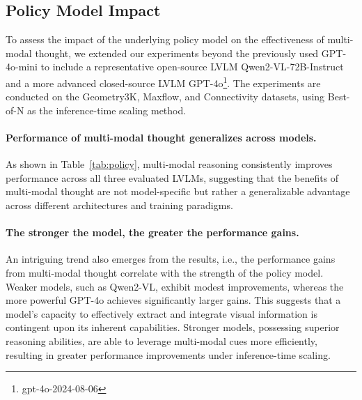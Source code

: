 \subsection{Policy Model Impact}




To assess the impact of the underlying policy model on the effectiveness of multi-modal thought, we extended our experiments beyond the previously used GPT-4o-mini to include a representative open-source LVLM Qwen2-VL-72B-Instruct and a more advanced closed-source LVLM GPT-4o\footnote{gpt-4o-2024-08-06}. The experiments are conducted on the Geometry3K, Maxflow, and Connectivity datasets, using Best-of-N as the inference-time scaling method.

\paragraph{Performance of multi-modal thought generalizes across models.}
As shown in Table~\ref{tab:policy}, multi-modal reasoning consistently improves performance across all three evaluated LVLMs, suggesting that the benefits of multi-modal thought are not model-specific but rather a generalizable advantage across different architectures and training paradigms.



\paragraph{The stronger the model, the greater the performance gains.}
An intriguing trend also emerges from the results, i.e., the performance gains from multi-modal thought correlate with the strength of the policy model. Weaker models, such as Qwen2-VL, exhibit modest improvements, whereas the more powerful GPT-4o achieves significantly larger gains. This suggests that a model's capacity to effectively extract and integrate visual information is contingent upon its inherent capabilities.  Stronger models, possessing superior reasoning abilities, are able to leverage multi-modal cues more efficiently, resulting in greater performance improvements under inference-time scaling.